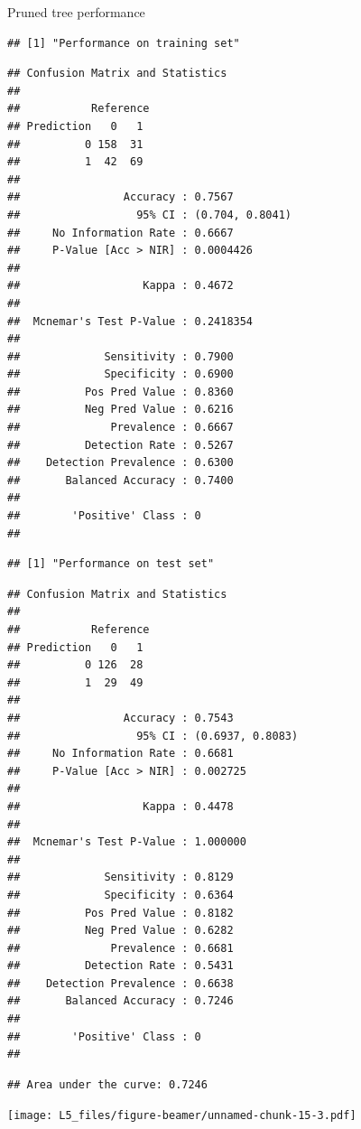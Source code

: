 \documentclass[
  ignorenonframetext,
]{beamer}
\begin{document}
\begin{frame}[fragile]
\begin{block}{Pruned tree performance}
\begin{verbatim}
## [1] "Performance on training set"
\end{verbatim}

\begin{verbatim}
## Confusion Matrix and Statistics
## 
##           Reference
## Prediction   0   1
##          0 158  31
##          1  42  69
##                                          
##                Accuracy : 0.7567         
##                  95% CI : (0.704, 0.8041)
##     No Information Rate : 0.6667         
##     P-Value [Acc > NIR] : 0.0004426      
##                                          
##                   Kappa : 0.4672         
##                                          
##  Mcnemar's Test P-Value : 0.2418354      
##                                          
##             Sensitivity : 0.7900         
##             Specificity : 0.6900         
##          Pos Pred Value : 0.8360         
##          Neg Pred Value : 0.6216         
##              Prevalence : 0.6667         
##          Detection Rate : 0.5267         
##    Detection Prevalence : 0.6300         
##       Balanced Accuracy : 0.7400         
##                                          
##        'Positive' Class : 0              
## 
\end{verbatim}

\begin{verbatim}
## [1] "Performance on test set"
\end{verbatim}

\begin{verbatim}
## Confusion Matrix and Statistics
## 
##           Reference
## Prediction   0   1
##          0 126  28
##          1  29  49
##                                           
##                Accuracy : 0.7543          
##                  95% CI : (0.6937, 0.8083)
##     No Information Rate : 0.6681          
##     P-Value [Acc > NIR] : 0.002725        
##                                           
##                   Kappa : 0.4478          
##                                           
##  Mcnemar's Test P-Value : 1.000000        
##                                           
##             Sensitivity : 0.8129          
##             Specificity : 0.6364          
##          Pos Pred Value : 0.8182          
##          Neg Pred Value : 0.6282          
##              Prevalence : 0.6681          
##          Detection Rate : 0.5431          
##    Detection Prevalence : 0.6638          
##       Balanced Accuracy : 0.7246          
##                                           
##        'Positive' Class : 0               
## 
\end{verbatim}

\begin{verbatim}
## Area under the curve: 0.7246
\end{verbatim}

\texttt{[image: L5\_files/figure-beamer/unnamed-chunk-15-3.pdf]}

\end{block}

\end{frame}
\end{document}
